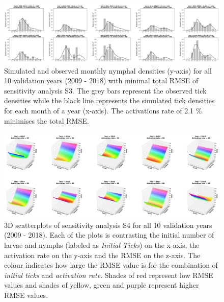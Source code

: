 \documentclass[a4paper, 11pt]{scrartcl}
\begin{document}
\begin{figure}
\centering
\includegraphics[width=1.0\textwidth]{figures/independent_initial_ticks_with_beech}
\caption{Simulated and observed monthly nymphal densities (y-axis) for all 10 validation years (2009 - 2018) with minimal total RMSE of sensitivity analysis S3. The grey bars
represent the observed tick densities while the black line represents the simulated tick densities for each month of a year (x-axis). The activations rate of 2.1 \% minimises
the total RMSE.}
\label{fig:independent_initial_ticks_with_beech_rotated}
\end{figure}

\begin{figure}
\centering
\includegraphics[width=1.0\textwidth]{figures/independent_initial_ticks_without_beech_error}
\caption{3D scatterplots of sensitivity analysis S4 for all 10 validation years (2009 - 2018). Each of the plots is contrasting the initial number of larvae and nymphs
(labeled as \textit{Initial Ticks}) on the x-axis, the activation rate on the y-axis and the RMSE on the z-axis. The colour indicates how large the RMSE value is for the
combination of \textit{initial ticks} and \textit{activation rate}. Shades of red represent low RMSE values and shades of yellow, green and purple represent higher RMSE values.}
\label{fig:independent_initial_ticks_without_beech_error_rotated}
\end{figure}
\end{document}
